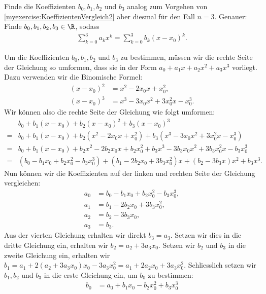 \begin{mychallenge}
Finde die Koeffizienten $b_0, b_1, b_2$ und $b_3$ analog zum Vorgehen von \cref{myexercise:KoeffizientenVergleich2} aber diesmal für den Fall $n=3$. Genauer:
Finde $b_0, b_1, b_2, b_3\in\R$, sodass
\begin{align*}
  \sum_{k=0}^3 a_kx^k = \sum_{k=0}^3 b_k(x-x_0)^k.
\end{align*}
\begin{myanswer}
  Um die Koeffizienten $b_0, b_1, b_2$ und $b_3$ zu bestimmen, müssen wir die rechte Seite der Gleichung so umformen, dass sie in der Form $a_0 + a_1x + a_2x^2 + a_3x^3$ vorliegt. Dazu verwenden wir die Binomische Formel:
  \begin{align*}
    (x-x_0)^2 &= x^2 - 2x_0x + x_0^2, \\
    (x-x_0)^3 &= x^3 - 3x_0x^2 + 3x_0^2x - x_0^3.
  \end{align*}
  Wir können also die rechte Seite der Gleichung wie folgt umformen:
  \begin{align*}
    &b_0 + b_1(x-x_0) + b_2(x-x_0)^2 + b_3(x-x_0)^3 \\
    =& b_0 + b_1(x-x_0) + b_2(x^2 - 2x_0x + x_0^2) + b_3(x^3 - 3x_0x^2 + 3x_0^2x - x_0^3) \\
    =& b_0 + b_1(x-x_0) + b_2x^2 - 2b_2x_0x + b_2x_0^2 + b_3x^3 - 3b_3x_0x^2 + 3b_3x_0^2x - b_3x_0^3 \\
    =& (b_0 - b_1x_0 + b_2x_0^2 - b_3x_0^3) + (b_1 - 2b_2x_0 + 3b_3x_0^2)x + (b_2 - 3b_3x)x^2 + b_3x^3.
  \end{align*}
  Nun können wir die Koeffizienten auf der linken und rechten Seite der Gleichung vergleichen:
  \begin{align*}
    a_{0} &= b_{0} - b_{1}x_{0} + b_{2}x_{0}^{2} - b_{3}x_{0}^{3}, \\
    a_{1} &= b_{1} - 2b_{2}x_{0} + 3b_{3}x_{0}^{2}, \\
    a_{2} &= b_{2} - 3b_{3}x_{0}, \\
    a_{3} &= b_{3}.
  \end{align*}
  Aus der vierten Gleichung erhalten wir direkt $b_3 = a_3$. Setzen wir dies in die dritte Gleichung ein, erhalten wir $b_2 = a_2 + 3a_3x_0$. Setzen wir $b_2$ und $b_3$ in die zweite Gleichung ein, erhalten wir $b_1 = a_1 + 2(a_2 + 3a_3x_0)x_0 - 3a_3x_0^2 = a_1 + 2a_2x_0 + 3a_3x_0^2$. Schliesslich setzen wir $b_1, b_2$ und $b_3$ in die erste Gleichung ein, um $b_0$ zu bestimmen:
  \begin{align*}
    b_0 &= a_0 + b_1x_0 - b_2x_0^2 + b_3x_0^3 \\

\end{align*}
\end{myanswer}
\end{mychallenge}
